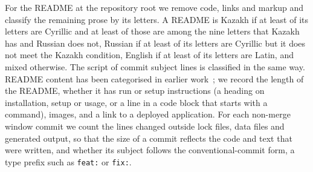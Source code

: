 \documentclass{article}
\begin{document}
For the README at the repository root we remove code, links and markup and classify the remaining prose by its letters. A README is Kazakh if at least \thrcyr{} of its letters are Cyrillic and at least \thrkaz{} of those are among the nine letters that Kazakh has and Russian does not, Russian if at least \thrcyr{} of its letters are Cyrillic but it does not meet the Kazakh condition, English if at least \thrlat{} of its letters are Latin, and mixed otherwise. The script of commit subject lines is classified in the same way. README content has been categorised in earlier work~\cite{prana2019readme}; we record the length of the README, whether it has run or setup instructions (a heading on installation, setup or usage, or a line in a code block that starts with a command), images, and a link to a deployed application. For each non-merge window commit we count the lines changed outside lock files, data files and generated output, so that the size of a commit reflects the code and text that were written, and whether its subject follows the conventional-commit form, a type prefix such as \texttt{feat:} or \texttt{fix:}.
\end{document}
